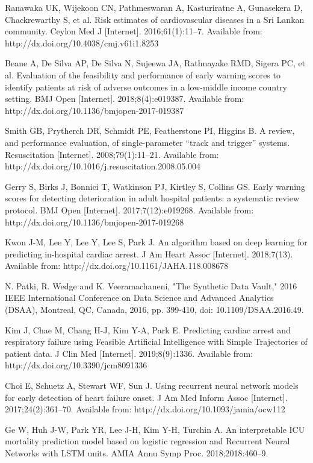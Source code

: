 \begin{thebibliography}{00}
Ranawaka UK, Wijekoon CN, Pathmeswaran A, Kasturiratne A, Gunasekera D, Chackrewarthy S, et al. Risk estimates of cardiovascular diseases in a Sri Lankan community. Ceylon Med J [Internet]. 2016;61(1):11–7. Available from: http://dx.doi.org/10.4038/cmj.v61i1.8253
 	 
Beane A, De Silva AP, De Silva N, Sujeewa JA, Rathnayake RMD, Sigera PC, et al. Evaluation of the feasibility and performance of early warning scores to identify patients at risk of adverse outcomes in a low-middle income country setting. BMJ Open [Internet]. 2018;8(4):e019387. Available from: http://dx.doi.org/10.1136/bmjopen-2017-019387
 	 
Smith GB, Prytherch DR, Schmidt PE, Featherstone PI, Higgins B. A review, and performance evaluation, of single-parameter “track and trigger” systems. Resuscitation [Internet]. 2008;79(1):11–21. Available from: http://dx.doi.org/10.1016/j.resuscitation.2008.05.004
 	 
Gerry S, Birks J, Bonnici T, Watkinson PJ, Kirtley S, Collins GS. Early warning scores for detecting deterioration in adult hospital patients: a systematic review protocol. BMJ Open [Internet]. 2017;7(12):e019268. Available from: http://dx.doi.org/10.1136/bmjopen-2017-019268
 	 
Kwon J-M, Lee Y, Lee Y, Lee S, Park J. An algorithm based on deep learning for predicting in-hospital cardiac arrest. J Am Heart Assoc [Internet]. 2018;7(13). Available from: http://dx.doi.org/10.1161/JAHA.118.008678

N. Patki, R. Wedge and K. Veeramachaneni, "The Synthetic Data Vault," 2016 IEEE International Conference on Data Science and Advanced Analytics (DSAA), Montreal, QC, Canada, 2016, pp. 399-410, doi: 10.1109/DSAA.2016.49.

Kim J, Chae M, Chang H-J, Kim Y-A, Park E. Predicting cardiac arrest and respiratory failure using Feasible Artificial Intelligence with Simple Trajectories of patient data. J Clin Med [Internet]. 2019;8(9):1336. Available from: http://dx.doi.org/10.3390/jcm8091336
 	 
Choi E, Schuetz A, Stewart WF, Sun J. Using recurrent neural network models for early detection of heart failure onset. J Am Med Inform Assoc [Internet]. 2017;24(2):361–70. Available from: http://dx.doi.org/10.1093/jamia/ocw112
 	 
Ge W, Huh J-W, Park YR, Lee J-H, Kim Y-H, Turchin A. An interpretable ICU mortality prediction model based on logistic regression and Recurrent Neural Networks with LSTM units. AMIA Annu Symp Proc. 2018;2018:460–9.
 	 

\end{thebibliography}
